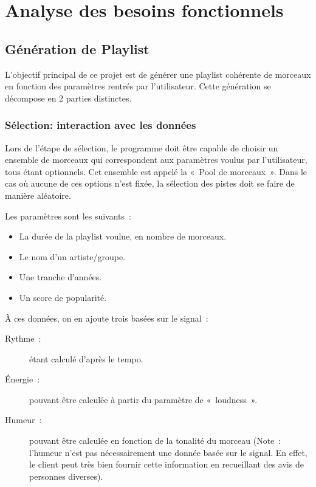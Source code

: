 \section{Analyse des besoins fonctionnels}
\label{besoins:fonc}

\subsection{Génération de Playlist}
\label{besoins:fonc:generation}

L’objectif principal de ce projet est de générer une playlist cohérente de 
morceaux en fonction des paramètres rentrés par l’utilisateur. Cette génération 
se décompose en 2 parties distinctes.

\subsubsection{Sélection: interaction avec les données}
\label{besoins:fonc:generation:selection}

Lors de l’étape de sélection, le programme doit être capable de choisir un 
ensemble de morceaux qui correspondent aux paramètres voulus par l'utilisateur, 
tous étant optionnels. Cet ensemble est appelé la «~Pool de morceaux~». Dans le 
cas où aucune de ces options n’est fixée, la sélection des pistes doit se faire 
de manière aléatoire.

\vspace{3mm}
\noindent Les paramètres sont les suivants~:
\begin{itemize}
\item La durée de la playlist voulue, en nombre de morceaux.
\item Le nom d'un artiste/groupe.
\item Une tranche d'années.
\item Un score de popularité.
\end{itemize}

\vspace{3mm}
\noindent À ces données, on en ajoute trois basées sur le signal~:
\begin{description}
\item[Rythme~:] étant calculé d'après le tempo.
\item[Énergie~:] pouvant être calculée à partir du paramètre de «~loudness~».
\item[Humeur~:] pouvant être calculée en fonction de la tonalité du morceau 
(Note~: l’humeur n’est pas nécessairement une donnée basée sur le signal. En 
effet, le client peut très bien fournir cette information en recueillant des 
avis de personnes diverses).
\end{description}

